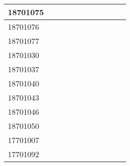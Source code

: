 \documentclass[12pt]{article}
\begin{document}
\begin{center}
\begin{small}
\begin{tabular}{|l|c|c|c|c|c|c|c|c|c|c|}
18701075 &  &  &  &  &  &  &  &  & \\ \hline 
18701076 &  &  &  &  &  &  &  &  & \\ \hline 
18701077 &  &  &  &  &  &  &  &  & \\ \hline 
18701030 &  &  &  &  &  &  &  &  & \\ \hline 
18701037 &  &  &  &  &  &  &  &  & \\ \hline 
18701040 &  &  &  &  &  &  &  &  & \\ \hline 
18701043 &  &  &  &  &  &  &  &  & \\ \hline 
18701046 &  &  &  &  &  &  &  &  & \\ \hline 
18701050 &  &  &  &  &  &  &  &  & \\ \hline 
17701007 &  &  &  &  &  &  &  &  & \\ \hline 
17701092 &  &  &  &  &  &  &  &  & \\ \hline 
        \end{tabular}
            \end{small}
            \end{center}
  \centering
            
\end{document}
